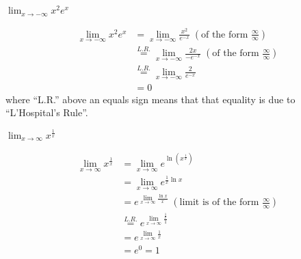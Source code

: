\documentclass[nooutcomes]{ximera}
\renewenvironment{freeResponse}{
\ifhandout\setbox0\vbox\bgroup\else
\begin{trivlist}\item[\hskip \labelsep\bfseries Solution:\hspace{2ex}]
\fi}
{\ifhandout\egroup\else
\end{trivlist}
\fi}
\begin{document}
\begin{problem}
\begin{enumerate}
  \item  $\lim_{x \to - \infty} x^2 e^x $
    \begin{freeResponse}
      \begin{align*}
        \lim_{x \to - \infty} x^2 e^x &= \lim_{x \to - \infty} \frac{x^2}{ e^{-x}} \; \left( \text{of the form } \frac{\infty}{\infty} \right) \\
                                      &\stackrel{L.R.}{=}  \lim_{x \to - \infty} \frac{2x}{- e^{-x}} \; \left( \text{of the form } \frac{\infty}{\infty} \right) \\
                                      &\stackrel{L.R.}{=}  \lim_{x \to - \infty} \frac{2}{ e^{-x}}  \\
                                      &= 0
      \end{align*}
      where ``L.R.'' above an equals sign means that that equality is due to ``L'Hospital's Rule''.  
    \end{freeResponse}
    
    
    
  \item  $\lim_{x \to \infty} x^{\frac{1}{x}} $
    \begin{freeResponse}
      \begin{align*}
        \lim_{x \to \infty} x^{\frac{1}{x}} &= \lim_{x \to \infty} e^{\ln \left( x^{\frac{1}{x}} \right) } \\
                                            &= \lim_{x \to \infty} e^{\frac{1}{x} \ln x } \\
                                            &= e^{ \lim_{x \to \infty} \frac{\ln x}{x} } \; \left( \text{limit is of the form } \frac{\infty}{\infty} \right) \\
                                            &\stackrel{L.R.}{=} e^{\lim_{x \to \infty}\frac{\frac{1}{x}}{1}} \\
                                            &= e^{\lim_{x \to \infty} \frac{1}{x}} \\
                                            &= e^0 = 1
      \end{align*}
    \end{freeResponse}
  \end{enumerate}
\end{problem}
\end{document}
